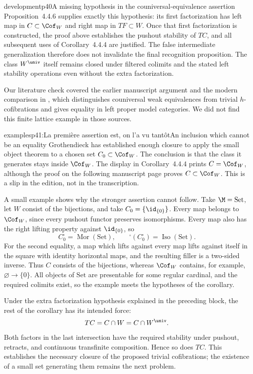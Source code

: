 \begin{dcomment}{development}{p40}{A missing hypothesis in the couniversal-equivalence assertion}
Proposition~4.4.6 supplies exactly this hypothesis: its first factorization has left map in $C\subset\Cof_W$ and right map in $TF\subset W$. Once that first factorization is constructed, the proof above establishes the pushout stability of $TC$, and all subsequent uses of Corollary~4.4.4 are justified. The false intermediate generalization therefore does not invalidate the final recognition proposition. The class $W^{\univ}$ itself remains closed under filtered colimits and the stated left stability operations even without the extra factorization.

Our literature check covered the earlier manuscript argument and the modern comparison in \citet[Lemma~1.10]{BataninBerger2017}, which distinguishes couniversal weak equivalences from trivial $h$-cofibrations and gives equality in left proper model categories. We did not find this finite lattice example in those sources.
\end{dcomment}

\begin{dcomment}{examples}{p41:La première assertion est, on l'a vu tantôt}{An inclusion which cannot be an equality}
Grothendieck has established enough closure to apply the small object theorem to a chosen set $C_0\subset\Cof_W$. The conclusion is that the class it generates stays inside $\Cof_W$. The display in Corollary~4.4.4 prints $C=\Cof_W$, although the proof on the following manuscript page proves $C\subset\Cof_W$. This is a slip in the edition, not in the transcription.

A small example shows why the stronger assertion cannot follow. Take $\M=\mathrm{Set}$, let $W$ consist of the bijections, and take $C_0=\{\id_{\{0\}}\}$. Every map belongs to $\Cof_W$, since every pushout functor preserves isomorphisms. Every map also has the right lifting property against $\id_{\{0\}}$, so
\[
C_0^{\square}=\operatorname{Mor}(\mathrm{Set}),\qquad
{}^{\square}(C_0^{\square})=\operatorname{Iso}(\mathrm{Set}).
\]
For the second equality, a map which lifts against every map lifts against itself in the square with identity horizontal maps, and the resulting filler is a two-sided inverse. Thus $C$ consists of the bijections, whereas $\Cof_W$ contains, for example, $\varnothing\to\{0\}$. All objects of $\mathrm{Set}$ are presentable for some regular cardinal, and the required colimits exist, so the example meets the hypotheses of the corollary.

Under the extra factorization hypothesis explained in the preceding block, the rest of the corollary has its intended force:
\[
TC=C\cap W=C\cap W^{\univ}.
\]
Both factors in the last intersection have the required stability under pushout, retracts, and continuous transfinite composition. Hence so does $TC$. This establishes the necessary closure of the proposed trivial cofibrations; the existence of a small set generating them remains the next problem.
\end{dcomment}

